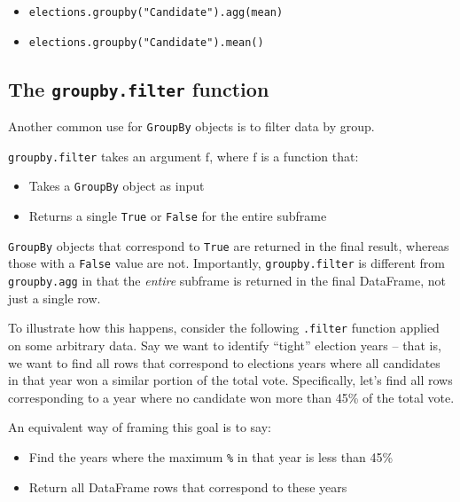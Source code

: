 \documentclass[
  letterpaper,
  DIV=11,
  numbers=noendperiod]{scrreprt}
\providecommand{\tightlist}{%
  \setlength{\itemsep}{0pt}\setlength{\parskip}{0pt}}\usepackage{longtable,booktabs,array}
\begin{document}
\begin{itemize}
\tightlist
\item
  \texttt{elections.groupby("Candidate").agg(mean)}
\item
  \texttt{elections.groupby("Candidate").mean()}
\end{itemize}

\hypertarget{the-groupby.filter-function}{%
\subsection{\texorpdfstring{The \texttt{groupby.filter}
function}{The groupby.filter function}}\label{the-groupby.filter-function}}

Another common use for \texttt{GroupBy} objects is to filter data by
group.

\texttt{groupby.filter} takes an argument \(\text{f}\), where
\(\text{f}\) is a function that:

\begin{itemize}
\tightlist
\item
  Takes a \texttt{GroupBy} object as input
\item
  Returns a single \texttt{True} or \texttt{False} for the entire
  subframe
\end{itemize}

\texttt{GroupBy} objects that correspond to \texttt{True} are returned
in the final result, whereas those with a \texttt{False} value are not.
Importantly, \texttt{groupby.filter} is different from
\texttt{groupby.agg} in that the \emph{entire} subframe is returned in
the final DataFrame, not just a single row.

To illustrate how this happens, consider the following \texttt{.filter}
function applied on some arbitrary data. Say we want to identify
``tight'' election years -- that is, we want to find all rows that
correspond to elections years where all candidates in that year won a
similar portion of the total vote. Specifically, let's find all rows
corresponding to a year where no candidate won more than 45\% of the
total vote.

An equivalent way of framing this goal is to say:

\begin{itemize}
\tightlist
\item
  Find the years where the maximum \texttt{\%} in that year is less than
  45\%
\item
  Return all DataFrame rows that correspond to these years
\end{itemize}
\end{document}
